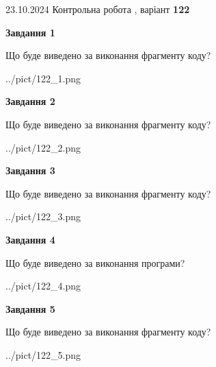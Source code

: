 \documentclass[12pt, ukrainian]{article}
\begin{document}
{\Large{23.10.2024 Контрольна робота , варіант  \No \textbf { 122 }\par}}
{
\begin {large}
{\begin {center}\textbf{Завдання 1}\end {center}}

Що буде виведено за виконання фрагменту коду?\par
\begin{center}
	{../pict/122_1.png}
\end{center}
\newpage

{\begin {center}\textbf{Завдання 2}\end {center}}

Що буде виведено за виконання фрагменту коду?\par
\begin{center}
	{../pict/122_2.png}
\end{center}
\newpage

{\begin {center}\textbf{Завдання 3}\end {center}}

Що буде виведено за виконання фрагменту коду?\par
\begin{center}
	{../pict/122_3.png}
\end{center}
\newpage

{\begin {center}\textbf{Завдання 4}\end {center}}

Що буде виведено за виконання програми?\par
\begin{center}
	{../pict/122_4.png}
\end{center}
\newpage

{\begin {center}\textbf{Завдання 5}\end {center}}

Що буде виведено за виконання фрагменту коду?\par
\begin{center}
	{../pict/122_5.png}
\end{center}
\newpage


\end{large}}
\end{document}
